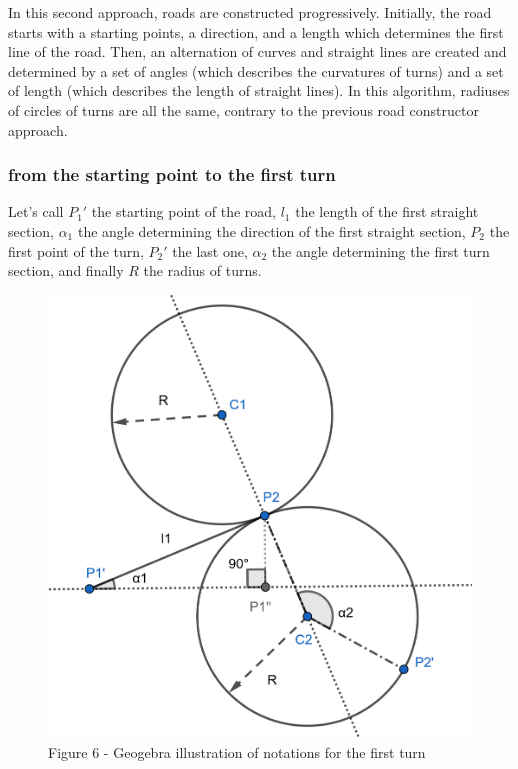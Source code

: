 \documentclass[a4paper,12pt,fleqn]{article}
\begin{document}
In this second approach, roads are constructed progressively. Initially, the road starts with a starting points, a direction, and a length which determines the first line of the road. Then, an alternation of curves and straight lines are created and determined by a set of angles (which describes the curvatures of turns) and a set of length (which describes the length of straight lines). In this algorithm, radiuses of circles of turns are all the same, contrary to the previous road constructor approach.

\subsubsection{from the starting point to the first turn}

Let's call \mbox{$P_1{'}$} the starting point of the road, \mbox{$l_1$} the length of the first straight section, \mbox{$\alpha_1$} the angle determining the direction of the first straight section,  \mbox{$P_2$} the first point of the turn, \mbox{$P_2{'}$} the last one, \mbox{$\alpha_2$} the angle determining the first turn section, and finally \mbox{$R$} the radius of turns.

\begin{figure}[H]
\centering
\includegraphics[width=\textwidth]{roadConstructor2Geogebra}
Figure 6 - Geogebra illustration of notations for the first turn
\end{figure}
\end{document}

